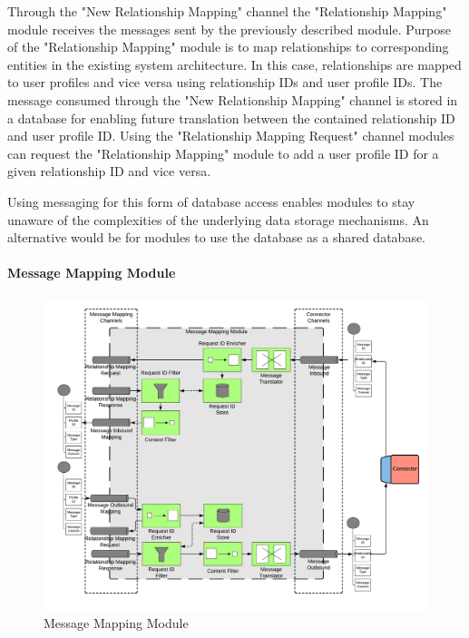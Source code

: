 Through the "New Relationship Mapping" channel the "Relationship Mapping" module receives the messages sent by the previously described module. Purpose of the "Relationship Mapping" module is to map relationships to corresponding entities in the existing system architecture. In this case, relationships are mapped to user profiles and vice versa using relationship IDs and user profile IDs. The message consumed through the "New Relationship Mapping" channel is stored in a database for enabling future translation between the contained relationship ID and user profile ID. Using the "Relationship Mapping Request" channel modules can request the "Relationship Mapping" module to add a user profile ID for a given relationship ID and vice versa.

Using messaging for this form of database access enables modules to stay unaware of the complexities of the underlying data storage mechanisms. An alternative would be for modules to use the database as a shared database.

\paragraph{Message Mapping Module}

\begin{figure}[h!]
    \centering
    \includegraphics[scale=0.6]{Diagrams/Integration Architecture 1/Technological Integration/10. Message Mapping Module.pdf}
    \caption{Message Mapping Module}
    \label{integration1:message_mapping_module}
\end{figure}

